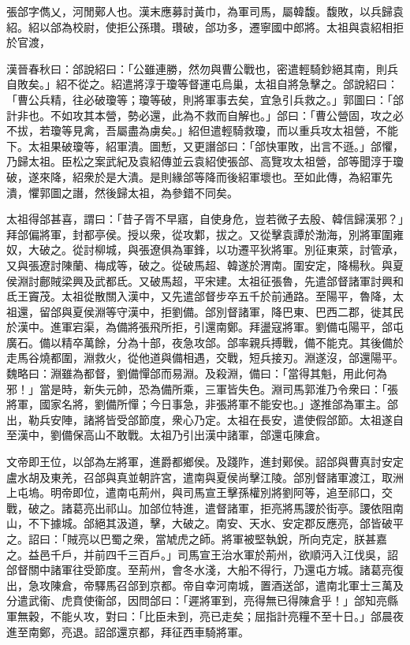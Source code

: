 
\begin{pinyinscope}
張郃字儁乂，河閒鄚人也。漢末應募討黃巾，為軍司馬，屬韓馥。馥敗，以兵歸袁紹。紹以郃為校尉，使拒公孫瓚。瓚破，郃功多，遷寧國中郎將。太祖與袁紹相拒於官渡，

漢晉春秋曰：郃說紹曰：「公雖連勝，然勿與曹公戰也，密遣輕騎鈔絕其南，則兵自敗矣。」紹不從之。紹遣將淳于瓊等督運屯烏巢，太祖自將急擊之。郃說紹曰：「曹公兵精，往必破瓊等；瓊等破，則將軍事去矣，宜急引兵救之。」郭圖曰：「郃計非也。不如攻其本營，勢必還，此為不救而自解也。」郃曰：「曹公營固，攻之必不拔，若瓊等見禽，吾屬盡為虜矣。」紹但遣輕騎救瓊，而以重兵攻太祖營，不能下。太祖果破瓊等，紹軍潰。圖慙，又更譖郃曰：「郃快軍敗，出言不遜。」郃懼，乃歸太祖。臣松之案武紀及袁紹傳並云袁紹使張郃、高覽攻太祖營，郃等聞淳于瓊破，遂來降，紹衆於是大潰。是則緣郃等降而後紹軍壞也。至如此傳，為紹軍先潰，懼郭圖之譖，然後歸太祖，為參錯不同矣。

太祖得郃甚喜，謂曰：「昔子胥不早寤，自使身危，豈若微子去殷、韓信歸漢邪？」拜郃偏將軍，封都亭侯。授以衆，從攻鄴，拔之。又從擊袁譚於渤海，別將軍圍雍奴，大破之。從討柳城，與張遼俱為軍鋒，以功遷平狄將軍。別征東萊，討管承，又與張遼討陳蘭、梅成等，破之。從破馬超、韓遂於渭南。圍安定，降楊秋。與夏侯淵討鄜賊梁興及武都氐。又破馬超，平宋建。太祖征張魯，先遣郃督諸軍討興和氐王竇茂。太祖從散關入漢中，又先遣郃督步卒五千於前通路。至陽平，魯降，太祖還，留郃與夏侯淵等守漢中，拒劉備。郃別督諸軍，降巴東、巴西二郡，徙其民於漢中。進軍宕渠，為備將張飛所拒，引還南鄭。拜盪寇將軍。劉備屯陽平，郃屯廣石。備以精卒萬餘，分為十部，夜急攻郃。郃率親兵搏戰，備不能克。其後備於走馬谷燒都圍，淵救火，從他道與備相遇，交戰，短兵接刃。淵遂沒，郃還陽平。魏略曰：淵雖為都督，劉備憚郃而易淵。及殺淵，備曰：「當得其魁，用此何為邪！」當是時，新失元帥，恐為備所乘，三軍皆失色。淵司馬郭淮乃令衆曰：「張將軍，國家名將，劉備所憚；今日事急，非張將軍不能安也。」遂推郃為軍主。郃出，勒兵安陣，諸將皆受郃節度，衆心乃定。太祖在長安，遣使假郃節。太祖遂自至漢中，劉備保高山不敢戰。太祖乃引出漢中諸軍，郃還屯陳倉。

文帝即王位，以郃為左將軍，進爵都鄉侯。及踐阼，進封鄚侯。詔郃與曹真討安定盧水胡及東羌，召郃與真並朝許宮，遣南與夏侯尚擊江陵。郃別督諸軍渡江，取洲上屯塢。明帝即位，遣南屯荊州，與司馬宣王擊孫權別將劉阿等，追至祁口，交戰，破之。諸葛亮出祁山。加郃位特進，遣督諸軍，拒亮將馬謖於街亭。謖依阻南山，不下據城。郃絕其汲道，擊，大破之。南安、天水、安定郡反應亮，郃皆破平之。詔曰：「賊亮以巴蜀之衆，當虓虎之師。將軍被堅執銳，所向克定，朕甚嘉之。益邑千戶，并前四千三百戶。」司馬宣王治水軍於荊州，欲順沔入江伐吳，詔郃督關中諸軍往受節度。至荊州，會冬水淺，大船不得行，乃還屯方城。諸葛亮復出，急攻陳倉，帝驛馬召郃到京都。帝自幸河南城，置酒送郃，遣南北軍士三萬及分遣武衞、虎賁使衞郃，因問郃曰：「遲將軍到，亮得無已得陳倉乎！」郃知亮縣軍無穀，不能乆攻，對曰：「比臣未到，亮已走矣；屈指計亮糧不至十日。」郃晨夜進至南鄭，亮退。詔郃還京都，拜征西車騎將軍。


\end{pinyinscope}
